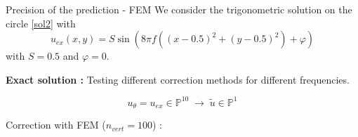 
        
        


        



\begin{frame}{Precision of the prediction - FEM}    
    We consider the trigonometric solution on the circle \eqref{sol2} with
    $$u_{ex}(x,y)=S\sin\left(8\pi f\left((x-0.5)^2+(y-0.5)^2\right)+\varphi\right)$$
    with $S=0.5$ and $\varphi=0$.

    \textbf{Exact solution :} Testing different correction methods for different frequencies.

    $$u_\theta=u_{ex}\in\mathbb{P}^{10} \; \rightarrow \; \tilde{u}\in\mathbb{P}^1$$

    \begin{center}     
        Correction with FEM ($n_{vert}=100$) :
        
    \end{center}
\end{frame}

